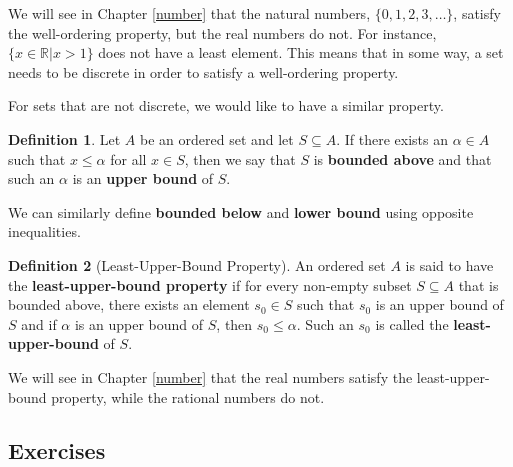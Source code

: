\documentclass[
]{book}
\theoremstyle{definition}
\newtheorem{definition}{Definition}[chapter]
\theoremstyle{definition}
\theoremstyle{definition}
\theoremstyle{definition}
\theoremstyle{remark}
\begin{document}
We will see in Chapter \ref{number} that the natural numbers, \(\{0,1,2,3,\ldots\}\), satisfy the well-ordering property, but the real numbers do not. For instance, \(\{x\in \mathbb{R}\vert x>1\}\) does not have a least element. This means that in some way, a set needs to be discrete in order to satisfy a well-ordering property.

For sets that are not discrete, we would like to have a similar property.

\begin{definition}
Let \(A\) be an ordered set and let \(S\subseteq A\). If there exists an \(\alpha \in A\) such that \(x\leq \alpha\) for all \(x\in S\), then we say that \(S\) is \textbf{bounded above} and that such an \(\alpha\) is an \textbf{upper bound} of \(S\).
\end{definition}

We can similarly define \textbf{bounded below} and \textbf{lower bound} using opposite inequalities.

\begin{definition}[Least-Upper-Bound Property]
An ordered set \(A\) is said to have the \textbf{least-upper-bound property} if for every non-empty subset \(S\subseteq A\) that is bounded above, there exists an element \(s_0\in S\) such that \(s_0\) is an upper bound of \(S\) and if \(\alpha\) is an upper bound of \(S\), then \(s_0\leq \alpha\). Such an \(s_0\) is called the \textbf{least-upper-bound} of \(S\).
\end{definition}

We will see in Chapter \ref{number} that the real numbers satisfy the least-upper-bound property, while the rational numbers do not.

\hypertarget{exercises-6}{%
\subsection{Exercises}\label{exercises-6}}
\end{document}
